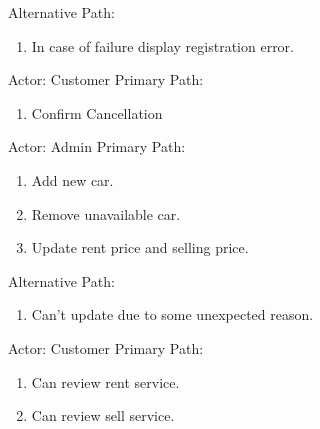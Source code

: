 \begin{figure}
\noindent Alternative Path:
\begin{enumerate}
\item  In case of failure display registration error.

\end{enumerate}

\noindent \textbf{}

\noindent Actor: Customer
\noindent Primary Path:

\begin{enumerate}
\item  Confirm Cancellation

\end{enumerate}


\noindent \textbf{}

\noindent Actor: Admin
\noindent Primary Path:

\begin{enumerate}
\item  Add new car.

\item  Remove unavailable car.

\item  Update rent price and selling price.
\end{enumerate}


\noindent Alternative Path:
\begin{enumerate}
\item  Can’t update due to some unexpected reason.

\end{enumerate}


\noindent \textbf{}

\noindent Actor: Customer
\noindent Primary Path:

\begin{enumerate}
\item  Can review rent service.

\item  Can review sell service.

\end{enumerate}

\end{figure}

